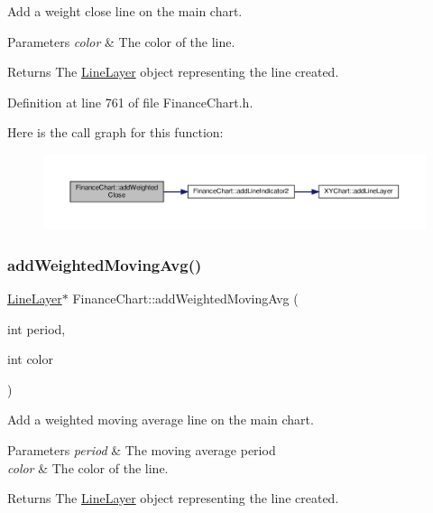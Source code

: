 Add a weight close line on the main chart. 


\begin{DoxyParams}{Parameters}
{\em color} & The color of the line.\\
\hline
\end{DoxyParams}
\begin{DoxyReturn}{Returns}
The \hyperlink{class_line_layer}{Line\+Layer} object representing the line created.
\end{DoxyReturn}


Definition at line 761 of file Finance\+Chart.\+h.

Here is the call graph for this function\+:
\nopagebreak
\begin{figure}[H]
\begin{center}
\leavevmode
\includegraphics[width=350pt]{class_finance_chart_a667247474a92a187877d74ee674f1250_cgraph}
\end{center}
\end{figure}
\mbox{\label{class_finance_chart_a9358bbba0b86affbe33cf44fa8cfe824}} 
\subsubsection{\texorpdfstring{add\+Weighted\+Moving\+Avg()}{addWeightedMovingAvg()}}
{\footnotesize\ttfamily \hyperlink{class_line_layer}{Line\+Layer}$\ast$ Finance\+Chart\+::add\+Weighted\+Moving\+Avg (\begin{DoxyParamCaption}\item[{int}]{period,  }\item[{int}]{color }\end{DoxyParamCaption})\hspace{0.3cm}{\ttfamily [inline]}}



Add a weighted moving average line on the main chart. 


\begin{DoxyParams}{Parameters}
{\em period} & The moving average period\\
\hline
{\em color} & The color of the line.\\
\hline
\end{DoxyParams}
\begin{DoxyReturn}{Returns}
The \hyperlink{class_line_layer}{Line\+Layer} object representing the line created.
\end{DoxyReturn}


